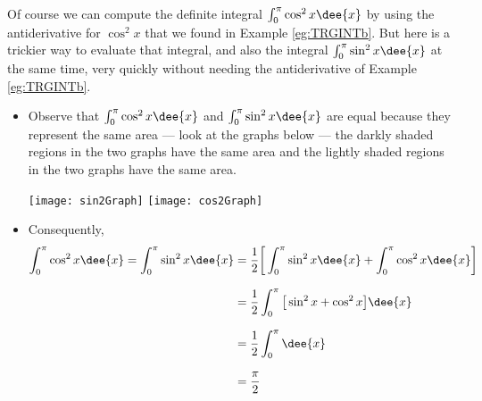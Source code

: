 \begin{eg}
                                                      \label{eg:TRGINTd}
Of course we can compute the definite integral $\int_0^\pi \cos^2 x\dee{x}$
by using the antiderivative for $\cos^2 x$ that we found in
Example \ref{eg:TRGINTb}. But here is a trickier way to evaluate that integral,
and also the integral $\int_0^\pi \sin^2 x\dee{x}$ at the same time,
very quickly without needing the antiderivative of  Example \ref{eg:TRGINTb}.

\soln
\begin{itemize}
 \item Observe that $\int_0^\pi \cos^2 x\dee{x}$ and
$\int_0^\pi \sin^2 x\dee{x}$ are equal because they represent the same
area --- look at the graphs below --- the darkly shaded regions in the
two graphs have the same area and the lightly shaded regions in the two
graphs have the same area.
\begin{efig}
\begin{center}
  \texttt{[image: sin2Graph]}\qquad
  \texttt{[image: cos2Graph]}
\end{center}
\end{efig}
\item Consequently,
\begin{align*}
\int_0^\pi \cos^2 x\dee{x}
= \int_0^\pi \sin^2 x\dee{x}
 &= \frac{1}{2}\bigg[\int_0^\pi \sin^2 x\dee{x}
                         +\int_0^\pi \cos^2 x\dee{x}\bigg] \\[0.1in]
&=\frac{1}{2}\int_0^\pi \big[\sin^2 x+ \cos^2 x\big]\dee{x}\\[0.1in]
&= \frac{1}{2}\int_0^\pi \dee{x} \\[0.1in]
&=\frac{\pi}{2}
\end{align*}
\end{itemize}
\end{eg}

